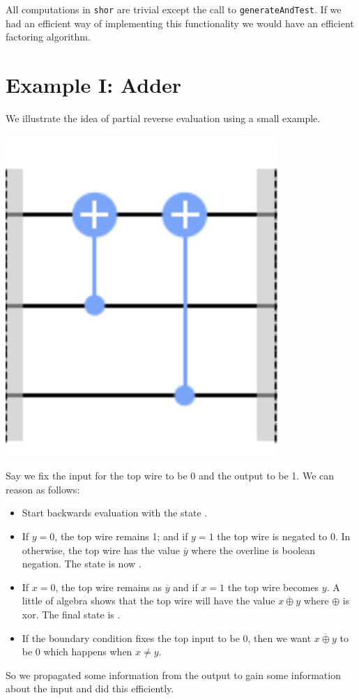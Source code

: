 \documentclass{article}
\begin{document}
All computations in \verb|shor| are trivial except the call to
\verb|generateAndTest|. If we had an efficient way of implementing
this functionality we would have an efficient factoring algorithm.     

\section{Example I: Adder}

We illustrate the idea of partial reverse evaluation using a small example.

\begin{center}
  \includegraphics[scale=0.5]{bac-adder.png}
\end{center}

Say we fix the input for the top wire to be 0 and the output to be
1. We can reason as follows:

\begin{itemize}
\item Start backwards evaluation with the state .
\item If $y=0$, the top wire remains 1; and if $y=1$ the top wire is
  negated to 0. In otherwise, the top wire has the value
  $\overline{y}$ where the overline is boolean negation. The state is
  now .
\item If $x=0$, the top wire remains as $\overline{y}$ and if $x=1$
  the top wire becomes $y$. A little of algebra shows that the top
  wire will have the value $\overline{x \oplus y}$ where $\oplus$ is
  xor. The final state is .
\item If the boundary condition fixes the top input to be 0, then we
  want $\overline{x \oplus y}$ to be 0 which happens when $x \neq y$.  
\end{itemize}
So we propagated some information from the output to gain some
information about the input and did this efficiently.
\end{document}
